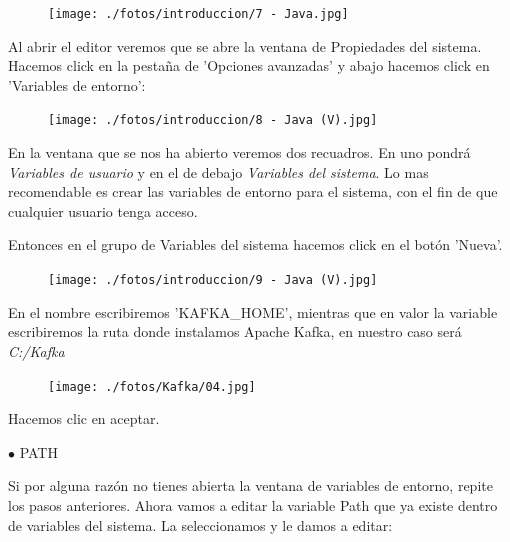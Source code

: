 \documentclass[a4paper,10pt]{article}
\begin{document}
\begin{figure}[H]
\begin{center}
\texttt{[image: ./fotos/introduccion/7 - Java.jpg]}
\end{center}
\end{figure}

\clearpage

Al abrir el editor veremos que se abre la ventana de Propiedades del sistema. Hacemos click en la pestaña de 'Opciones avanzadas' y abajo hacemos click en 'Variables de entorno':

\begin{figure}[H]
\begin{center}
\texttt{[image: ./fotos/introduccion/8 - Java (V).jpg]}
\end{center}
\end{figure}

En la ventana que se nos ha abierto veremos dos recuadros. En uno pondrá \textit{Variables de usuario} y en el de debajo \textit{Variables del sistema}. Lo mas recomendable es crear las variables de entorno para el sistema, con el fin de que cualquier usuario tenga acceso. 

Entonces en el grupo de Variables del sistema hacemos click en el botón 'Nueva'.

\begin{figure}[H]
\begin{center}
\texttt{[image: ./fotos/introduccion/9 - Java (V).jpg]}
\end{center}
\end{figure}

\clearpage

En el nombre escribiremos 'KAFKA\_HOME', mientras que en valor la variable escribiremos la ruta donde instalamos Apache Kafka, en nuestro caso será \textit{C:/Kafka}

\begin{figure}[H]
\begin{center}
\texttt{[image: ./fotos/Kafka/04.jpg]}
\end{center}
\end{figure}

Hacemos clic en aceptar.

$\bullet$ PATH 

Si por alguna razón no tienes abierta la ventana de variables de entorno, repite los pasos anteriores. Ahora vamos a editar la variable Path que ya existe dentro de variables del sistema. La seleccionamos y le damos a editar:
\end{document}
